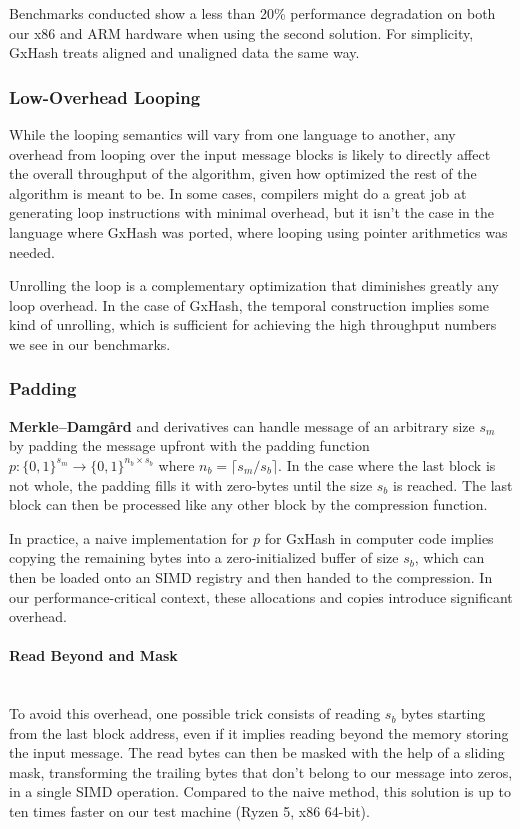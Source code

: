 \documentclass[10pt]{article}
\begin{document}
Benchmarks conducted show a less than 20\% performance degradation on both our x86 and ARM hardware when using the second solution. For simplicity, GxHash treats aligned and unaligned data the same way.

\subsubsection{Low-Overhead Looping}

While the looping semantics will vary from one language to another, any overhead from looping over the input message blocks is likely to directly affect the overall throughput of the algorithm, given how optimized the rest of the algorithm is meant to be. In some cases, compilers might do a great job at generating loop instructions with minimal overhead, but it isn't the case in the language where GxHash was ported, where looping using pointer arithmetics was needed.

Unrolling the loop is a complementary optimization that diminishes greatly any loop overhead. In the case of GxHash, the temporal construction implies some kind of unrolling, which is sufficient for achieving the high throughput numbers we see in our benchmarks.

\subsubsection{Padding}

\textbf{Merkle–Damgård} and derivatives can handle message of an arbitrary size \( s_m \) by padding the message upfront with the padding function \( p: \{0,1\}^{s_m} \to \{0,1\}^{n_b \times s_b} \) where \( n_b = \lceil s_m/s_b \rceil \). In the case where the last block is not whole, the padding fills it with zero-bytes until the size \( s_b \) is reached. The last block can then be processed like any other block by the compression function.

In practice, a naive implementation for \( p \) for GxHash in computer code implies copying the remaining bytes into a zero-initialized buffer of size \( s_b \), which can then be loaded onto an SIMD registry and then handed to the compression. In our performance-critical context, these allocations and copies introduce significant overhead.

\paragraph{Read Beyond and Mask}\leavevmode\\
To avoid this overhead, one possible trick consists of reading \( s_b \) bytes starting from the last block address, even if it implies reading beyond the memory storing the input message. The read bytes can then be masked with the help of a sliding mask, transforming the trailing bytes that don't belong to our message into zeros, in a single SIMD operation. Compared to the naive method, this solution is up to ten times faster on our test machine (Ryzen 5, x86 64-bit).
\end{document}

